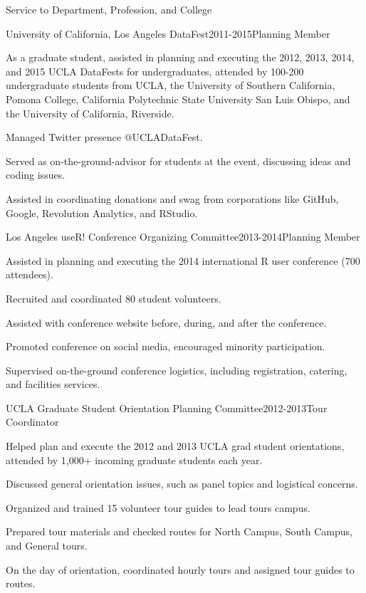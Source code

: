 \documentclass{resume} %
\begin{document}
\begin{rSection}{Service to Department, Profession, and College}
\begin{rSubsection}{University of California, Los Angeles DataFest}{}{2011-2015}{Planning Member}
\item As a graduate student, assisted in planning and executing the 2012, 2013, 2014, and 2015 UCLA DataFests for undergraduates, attended by 100-200 undergraduate students from UCLA, the University of Southern California, Pomona College, California Polytechnic State University San Luis Obispo, and the University of California, Riverside. 
\item Managed Twitter presence @UCLADataFest. 
\item Served as on-the-ground-advisor for students at the event, discussing ideas and coding issues. 
\item Assisted in coordinating donations and swag from corporations like GitHub, Google, Revolution Analytics, and RStudio. 
\end{rSubsection}

\begin{rSubsection}{Los Angeles useR! Conference Organizing Committee}{}{2013-2014}{Planning Member}
\item Assisted in planning and executing the 2014 international R user conference (700 attendees).
\item Recruited and coordinated 80 student volunteers.
\item Assisted with conference website before, during, and after the conference.
\item Promoted conference on social media, encouraged minority participation.
\item Supervised on-the-ground conference logistics, including registration, catering, and facilities services. 
\end{rSubsection}

\begin{rSubsection}{UCLA Graduate Student Orientation Planning Committee}{}{2012-2013}{Tour Coordinator}
\item Helped plan and execute the 2012 and 2013 UCLA grad student orientations, attended by 1,000+ incoming graduate students each year. 
\item Discussed general orientation issues, such as panel topics and logistical concerns.
\item Organized and trained 15 volunteer tour guides to lead tours campus.
\item Prepared tour materials and checked routes for North Campus, South Campus, and General tours.
\item On the day of orientation, coordinated hourly tours and assigned tour guides to routes.
\end{rSubsection}


\end{rSection}
\end{document}
